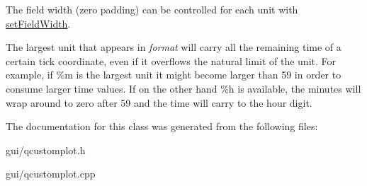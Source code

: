 The field width (zero padding) can be controlled for each unit with \hyperlink{classQCPAxisTickerTime_adc13e54fc969be98a5c0e3fa0dbaa293}{set\+Field\+Width}.

The largest unit that appears in {\itshape format} will carry all the remaining time of a certain tick coordinate, even if it overflows the natural limit of the unit. For example, if \%m is the largest unit it might become larger than 59 in order to consume larger time values. If on the other hand \%h is available, the minutes will wrap around to zero after 59 and the time will carry to the hour digit. 

The documentation for this class was generated from the following files\+:\begin{DoxyCompactItemize}
\item 
gui/qcustomplot.\+h\item 
gui/qcustomplot.\+cpp\end{DoxyCompactItemize}
